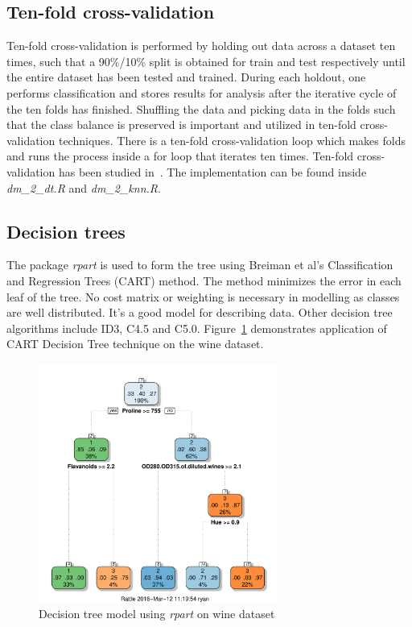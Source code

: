 \documentclass[11pt]{article}
\begin{document}
\subsection{Ten-fold cross-validation}
Ten-fold cross-validation is performed by holding out data across a dataset ten times, such that a 90\%/10\% split is obtained for train and test respectively until the entire dataset has been tested and trained. During each holdout, one performs classification and stores results for analysis after the iterative cycle of the ten folds has finished. Shuffling the data and picking data in the folds such that the class balance is preserved is important and utilized in ten-fold cross-validation techniques. There is a ten-fold cross-validation loop which makes folds and runs the process inside a for loop that iterates ten times. Ten-fold cross-validation has been studied in~\cite{kohavi1995study}. The implementation can be found inside \textit{dm\_2\_dt.R} and \textit{dm\_2\_knn.R}.

\subsection{Decision trees}
The package \textit{rpart} is used to form the tree using Breiman et al's Classification and Regression Trees (CART) method\cite{breiman1984classification}. The method minimizes the error in each leaf of the tree. No cost matrix or weighting is necessary in modelling as classes are well distributed. It's a good model for describing data. Other decision tree algorithms include ID3, C4.5 and C5.0. Figure~\ref{fig:t2_tree} demonstrates application of CART Decision Tree technique on the wine dataset. 
\begin{figure}[H]
    \centering
    \includegraphics[width=0.7\textwidth]{t2_tree}
    \caption{Decision tree model using \textit{rpart} on wine dataset}
    \label{fig:t2_tree}
\end{figure}
\end{document}
